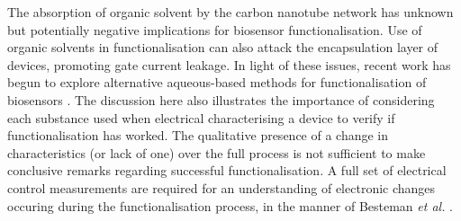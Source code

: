 \documentclass[
  a4paper,
]{scrbook}
\begin{document}
The absorption of organic solvent by the carbon nanotube network has
unknown but potentially negative implications for biosensor
functionalisation. Use of organic solvents in functionalisation can also
attack the encapsulation layer of devices, promoting gate current
leakage. In light of these issues, recent work has begun to explore
alternative aqueous-based methods for functionalisation of biosensors
\autocite{Khan2021}. The discussion here also illustrates the importance
of considering each substance used when electrical characterising a
device to verify if functionalisation has worked. The qualitative
presence of a change in characteristics (or lack of one) over the full
process is not sufficient to make conclusive remarks regarding
successful functionalisation. A full set of electrical control
measurements are required for an understanding of electronic changes
occuring during the functionalisation process, in the manner of Besteman
\emph{et al.} \autocite{Besteman2003}.

\newpage
{}

\hfill\break
\hfill\break
\end{document}
